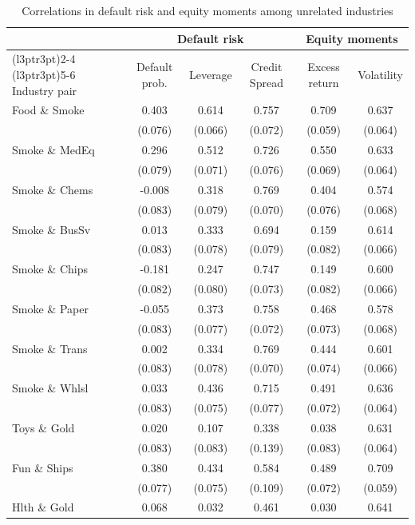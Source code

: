 \begin{table}

\caption{\label{tab:table-oa5}Correlations in default risk and equity moments among unrelated industries}
\centering
\begin{tabular}[t]{lccccc}
\toprule
\multicolumn{1}{c}{ } & \multicolumn{3}{c}{Default risk} & \multicolumn{2}{c}{Equity moments} \\
\cmidrule(l{3pt}r{3pt}){2-4} \cmidrule(l{3pt}r{3pt}){5-6}
Industry pair & Default prob. & Leverage & Credit Spread & Excess return & Volatility\\
\midrule
Food \& Smoke & 0.403 & 0.614 & 0.757 & 0.709 & 0.637\\
 & (0.076) & (0.066) & (0.072) & (0.059) & (0.064)\\
Smoke \& MedEq & 0.296 & 0.512 & 0.726 & 0.550 & 0.633\\
 & (0.079) & (0.071) & (0.076) & (0.069) & (0.064)\\
Smoke \& Chems & -0.008 & 0.318 & 0.769 & 0.404 & 0.574\\
\addlinespace
 & (0.083) & (0.079) & (0.070) & (0.076) & (0.068)\\
Smoke \& BusSv & 0.013 & 0.333 & 0.694 & 0.159 & 0.614\\
 & (0.083) & (0.078) & (0.079) & (0.082) & (0.066)\\
Smoke \& Chips & -0.181 & 0.247 & 0.747 & 0.149 & 0.600\\
 & (0.082) & (0.080) & (0.073) & (0.082) & (0.066)\\
\addlinespace
Smoke \& Paper & -0.055 & 0.373 & 0.758 & 0.468 & 0.578\\
 & (0.083) & (0.077) & (0.072) & (0.073) & (0.068)\\
Smoke \& Trans & 0.002 & 0.334 & 0.769 & 0.444 & 0.601\\
 & (0.083) & (0.078) & (0.070) & (0.074) & (0.066)\\
Smoke \& Whlsl & 0.033 & 0.436 & 0.715 & 0.491 & 0.636\\
\addlinespace
 & (0.083) & (0.075) & (0.077) & (0.072) & (0.064)\\
Toys \& Gold & 0.020 & 0.107 & 0.338 & 0.038 & 0.631\\
 & (0.083) & (0.083) & (0.139) & (0.083) & (0.064)\\
Fun \& Ships & 0.380 & 0.434 & 0.584 & 0.489 & 0.709\\
 & (0.077) & (0.075) & (0.109) & (0.072) & (0.059)\\
\addlinespace
Hlth \& Gold & 0.068 & 0.032 & 0.461 & 0.030 & 0.641\\

\end{tabular}
\end{table}
